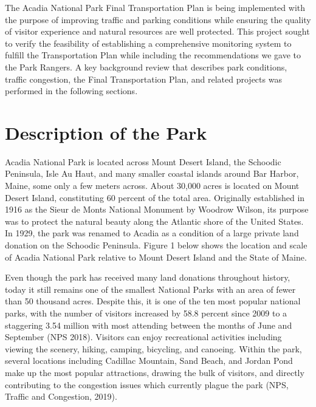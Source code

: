 \par The Acadia National Park Final Transportation Plan is being implemented with the purpose of improving traffic and parking conditions while ensuring the quality of visitor experience and natural resources are well protected.  This project sought to verify the feasibility of establishing a comprehensive monitoring system to fulfill the Transportation Plan while including the recommendations we gave to the Park Rangers.  A key background review that describes park conditions, traffic congestion, the Final Transportation Plan, and related projects was performed in the following sections.

\section{Description of the Park}
\par Acadia National Park is located across Mount Desert Island, the Schoodic Peninsula, Isle Au Haut, and many smaller coastal islands around Bar Harbor, Maine, some only a few meters across. About 30,000 acres is located on Mount Desert Island, constituting 60 percent of the total area. Originally established in 1916 as the Sieur de Monts National Monument by Woodrow Wilson, its purpose was to protect the natural beauty along the Atlantic shore of the United States. In 1929, the park was renamed to Acadia as a condition of a large private land donation on the Schoodic Peninsula.  Figure 1 below shows the location and scale of Acadia National Park relative to Mount Desert Island and the State of Maine.


\par Even though the park has received many land donations throughout history, today it still remains one of the smallest National Parks with an area of fewer than 50 thousand acres. Despite this, it is one of the ten most popular national parks, with the number of visitors increased by 58.8 percent since 2009 to a staggering 3.54 million with most attending between the months of June and September (NPS 2018). Visitors can enjoy recreational activities including viewing the scenery, hiking, camping, bicycling, and canoeing. Within the park, several locations including Cadillac Mountain, Sand Beach, and Jordan Pond make up the most popular attractions, drawing the bulk of visitors, and directly contributing to the congestion issues which currently plague the park (NPS, Traffic and Congestion, 2019).

